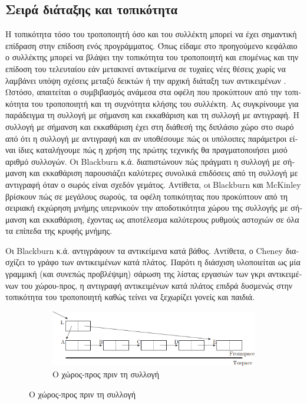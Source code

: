 \begin{greek}
\section{Σειρά διάταξης και τοπικότητα}
Η τοπικότητα τόσο του τροποποιητή όσο και του συλλέκτη μπορεί
να έχει σημαντική επίδραση στην επίδοση ενός προγράμματος. Όπως
είδαμε στο προηγούμενο κεφάλαιο ο συλλέκτης μπορεί να βλάψει
την τοπικότητα του τροποποιητή και επομένως και την επίδοση 
του τελευταίου εάν μετακινεί αντικείμενα σε τυχαίες νέες θέσεις 
χωρίς να λαμβάνει υπόψη σχέσεις μεταξύ δεικτών ή την αρχική 
διάταξη των αντικειμένων \cite{DBLP:conf/oopsla/AbuaiadhOPS04}. 
Ωστόσο, απαιτείται ο συμβιβασμός ανάμεσα στα οφέλη που προκύπτουν 
από την τοπικότητα του τροποποιητή και τη συχνότητα κλήσης του 
συλλέκτη. Ας συγκρίνουμε για παράδειγμα τη συλλογή με σήμανση 
και εκκαθάριση και τη συλλογή με αντιγραφή. Η συλλογή με σήμανση 
και εκκαθάριση έχει στη διάθεσή της διπλάσιο χώρο στο σωρό από 
ότι η συλλογή με αντιγραφή και αν υποθέσουμε πώς οι υπόλοιπες 
παράμετροι είναι ίδιες καταλήγουμε πώς η χρήση της πρώτης τεχνικής 
θα πραγματοποιήσει μισό αριθμό συλλογών. Οι Blackburn κ.ά. \cite{DBLP:conf/icse/BlackburnCM04} διαπιστώνουν πώς πράγματι η
συλλογή με σήμανση και εκκαθάριση παρουσιάζει καλύτερες συνολικά
επιδόσεις από τη συλλογή με αντιγραφή όταν ο σωρός είναι σχεδόν
γεμάτος. Αντίθετα, oι Blackburn και McKinley \cite{DBLP:conf/oopsla/BlackburnM03} βρίσκουν πώς
σε μεγάλους σωρούς, τα οφέλη τοπικότητας που προκύπτουν από τη 
σειριακή εκχώρηση μνήμης υπερνικούν την αποδοτικότητα χώρου
της συλλογής με σήμανση και εκκαθάριση, έχοντας ως αποτέλεσμα
καλύτερους ρυθμούς αστοχιών σε όλα τα επίπεδα της κρυφής μνήμης.

Οι Blackburn κ.ά. \cite{DBLP:conf/icse/BlackburnCM04} αντιγράφουν τα αντικείμενα κατά βάθος.
Αντίθετα, ο Cheney διασχίζει το γράφο των αντικειμένων κατά πλάτος. 
Παρότι η διάσχιση υλοποιείται ως μία γραμμική (και συνεπώς προβλέψιμη) 
σάρωση της λίστας εργασιών των γκρι αντικειμένων του χώρου-προς,
η αντιγραφή αντικειμένων κατά πλάτος επιδρά δυσμενώς στην τοπικότητα
του τροποποιητή καθώς τείνει να ξεχωρίζει γονείς και παιδιά.

\begin{figure}[H]
  \centering
  \begin{subfigure}{1.0\textwidth}
    \includegraphics{figures/cop_1a}
    \caption{Ο χώρος-προς πριν τη συλλογή}
  \end{subfigure}


\end{figure}
\end{greek}
